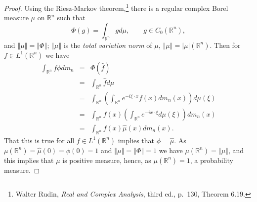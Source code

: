\documentclass{article}
\newcommand{\norm}[1]{\left\Vert #1 \right\Vert}
\theoremstyle{definition}
\begin{document}
\begin{proof}
Using the Riesz-Markov theorem,\footnote{Walter Rudin, {\em Real and Complex Analysis}, third ed., p.~130, Theorem 6.19.}
there is a regular complex Borel measure $\mu$ on $\mathbb{R}^n$ such that
\[
\Phi(g) = \int_{\mathbb{R}^n} g d\mu, \qquad g \in C_0(\mathbb{R}^n),
\]
and $\norm{\mu}=\norm{\Phi}$; $\norm{\mu}$ is the {\em total variation norm} of $\mu$, $\norm{\mu}=|\mu|(\mathbb{R}^n)$.
Then for $f \in L^1(\mathbb{R}^n)$ we have
\begin{eqnarray*}
\int_{\mathbb{R}^n} f\phi dm_n&=&\Phi(\hat{f})\\
&=&\int_{\mathbb{R}^n} \hat{f} d\mu \\
&=&\int_{\mathbb{R}^n}\left( \int_{\mathbb{R}^n} e^{-i\xi\cdot x} f(x) dm_n(x) \right) d\mu(\xi)\\
&=&\int_{\mathbb{R}^n} f(x) \left( \int_{\mathbb{R}^n} e^{-ix\cdot \xi} d\mu(\xi) \right) dm_n(x)\\
&=&\int_{\mathbb{R}^n} f(x) \hat{\mu}(x) dm_n(x).
\end{eqnarray*}
That this is true for all $f \in L^1(\mathbb{R}^n)$ implies that $\phi=\hat{\mu}$.
As $\mu(\mathbb{R}^n)=\hat{\mu}(0)=\phi(0)=1$ and $\norm{\mu}=\norm{\Phi}=1$ we have $\mu(\mathbb{R}^n) = \norm{\mu}$, and this implies that
$\mu$ is positive measure, hence, as $\mu(\mathbb{R}^n)=1$, a probability measure.

\end{proof}
\end{document}
